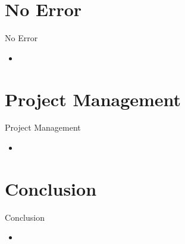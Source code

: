 \documentclass{beamer}
\begin{document}
\section{No Error}
\begin{frame}{No Error}
\begin{itemize}
  \item 
  \end{itemize}
\end{frame}

\section{Project Management}
\begin{frame}{Project Management}
\begin{itemize}
  \item 
  \end{itemize}
\end{frame}

\section{Conclusion}
\begin{frame}{Conclusion}
\begin{itemize}
  \item 
  \end{itemize}
\end{frame}
\end{document}
